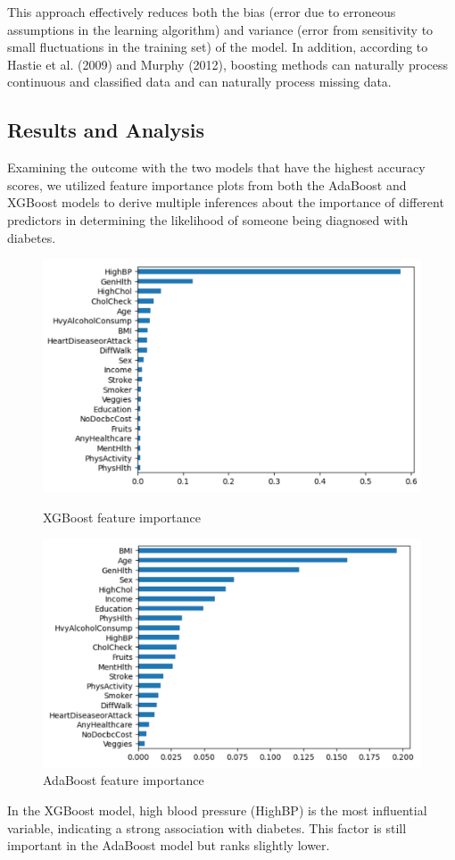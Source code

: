 \documentclass[]{article}
\begin{document}
This approach effectively reduces both the bias (error due to erroneous assumptions in the learning algorithm) and variance (error from sensitivity to small fluctuations in the training set) of the model. In addition, according to Hastie et al. (2009) and Murphy (2012), boosting methods can naturally process continuous and classified data and can naturally process missing data. 

\subsection{Results and Analysis}
Examining the outcome with the two models that have the highest accuracy scores, we utilized feature importance plots from both the AdaBoost and XGBoost models to derive multiple inferences about the importance of different predictors in determining the likelihood of someone being diagnosed with diabetes.
\begin{figure}[h]
  \centering
  \begin{minipage}[b]{0.45\textwidth}
    \centering
    \includegraphics[width=0.8\linewidth]{xgboost_w.png}
    \caption{XGBoost feature importance}
  \end{minipage}\hfill
  \begin{minipage}[b]{0.45\textwidth}
    \centering
    \includegraphics[width=0.8\linewidth]{adaboost_w.png}
    \caption{AdaBoost feature importance}
  \end{minipage}
\end{figure}
In the XGBoost model, high blood pressure (HighBP) is the most influential variable,
indicating a strong association with diabetes. This factor is still important in the AdaBoost model but ranks slightly lower. 
\end{document}
